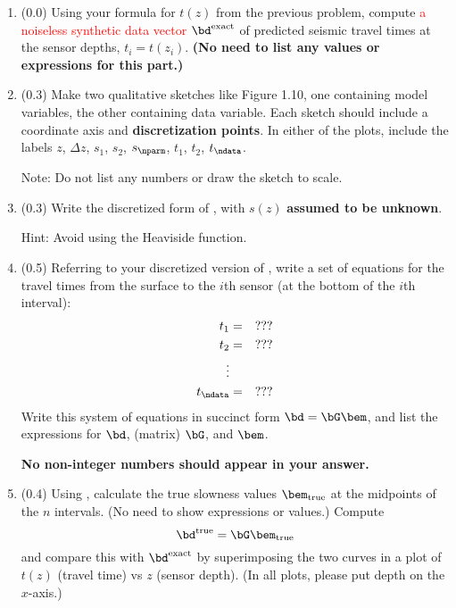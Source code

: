 \documentclass[11pt,titlepage,fleqn]{article}
\begin{document}
\begin{enumerate}

\item (0.0) Using your formula for $t(z)$ from the previous problem, compute \textcolor{red}{a noiseless synthetic data vector $\bd^{\rm exact}$} of predicted seismic travel times at the sensor depths, $t_i = t(z_i)$. 
{\bf (No need to list any values or expressions for this part.)}

\item (0.3)  Make two qualitative sketches like Figure 1.10, one containing model variables, the other containing data variable. Each sketch should include a coordinate axis and {\bf discretization points}. In either of the plots, include the labels $z$, $\Delta z$, $s_1$, $s_2$, $s_\nparm$, $t_1$, $t_2$, $t_\ndata$.

Note: Do not list any numbers or draw the sketch to scale.


\item (0.3) Write the discretized form of , with $s(z)$ {\bf assumed to be unknown}.

Hint: Avoid using the Heaviside function.


\item (0.5) Referring to your discretized version of , write a set of equations for the travel times from the surface to the $i$th sensor (at the bottom of the $i$th interval):
%
\begin{eqnarray*}
t_1 &=& ???
\\
t_2 &=& ???
\\
\vdots
\\
t_\ndata &=& ???
\end{eqnarray*}
% 
Write this system of equations in succinct form $\bd = \bG\bem$, and list the expressions for $\bd$, (matrix) $\bG$, and $\bem$.

{\bf No non-integer numbers should appear in your answer.}


\item (0.4) Using , calculate the true slowness values $\bem_{\rm true}$ at the midpoints of the $n$ intervals. (No need to show expressions or values.) Compute
%
\begin{equation}
\bd^{\rm true} = \bG\bem_{\rm true}
\end{equation}
%
and compare this with $\bd^{\rm exact}$ by superimposing the two curves in a plot of $t(z)$ (travel time) vs $z$ (sensor depth). (In all plots, please put depth on the $x$-axis.)


\end{enumerate}
\end{document}

